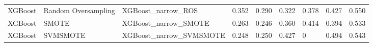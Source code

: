 \begin{tabular}{lllllllll}
                     XGBoost & Random Oversampling &                           XGBoost\_narrow\_ROS & 0.352 &                     0.290 &                 0.322 &                  0.378 &                                   0.427 &    0.550 \\
                     XGBoost &               SMOTE &                         XGBoost\_narrow\_SMOTE & 0.263 &                     0.246 &                 0.360 &                  0.414 &                                   0.394 &    0.533 \\
                     XGBoost &            SVMSMOTE &                      XGBoost\_narrow\_SVMSMOTE & 0.248 &                     0.250 &                 0.427 &                      0 &                                   0.494 &    0.543 \\
\bottomrule
\end{tabular}
